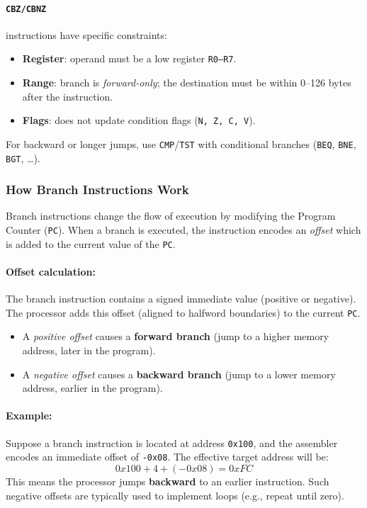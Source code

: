\paragraph{\texttt{CBZ/CBNZ}} instructions have specific constraints:
\begin{itemize}[nosep]
  \item \textbf{Register}: operand must be a low register \texttt{R0--R7}.
  \item \textbf{Range}: branch is \emph{forward-only}; the destination must be within 0--126 bytes after the instruction.
  \item \textbf{Flags}: does not update condition flags (\texttt{N, Z, C, V}).
\end{itemize}
For backward or longer jumps, use \texttt{CMP}/\texttt{TST} with conditional branches (\texttt{BEQ}, \texttt{BNE}, \texttt{BGT}, \dots).
\subsubsection{How Branch Instructions Work}

Branch instructions change the flow of execution by modifying the Program Counter (\texttt{PC}). 
When a branch is executed, the instruction encodes an \emph{offset} which is added to the current value of the \texttt{PC}.

\paragraph{Offset calculation:}  
The branch instruction contains a signed immediate value (positive or negative).  
The processor adds this offset (aligned to halfword boundaries) to the current \texttt{PC}.  
\begin{itemize}
    \item A \emph{positive offset} causes a \textbf{forward branch} (jump to a higher memory address, later in the program).  
    \item A \emph{negative offset} causes a \textbf{backward branch} (jump to a lower memory address, earlier in the program).  
\end{itemize} 

\paragraph{Example:}  
Suppose a branch instruction is located at address \texttt{0x100}, and the assembler encodes an immediate offset of \texttt{-0x08}.  
The effective target address will be:
\[
0x100 + 4 + (-0x08) = 0xFC
\]
This means the processor jumps \textbf{backward} to an earlier instruction.  
Such negative offsets are typically used to implement loops (e.g., repeat until zero).


